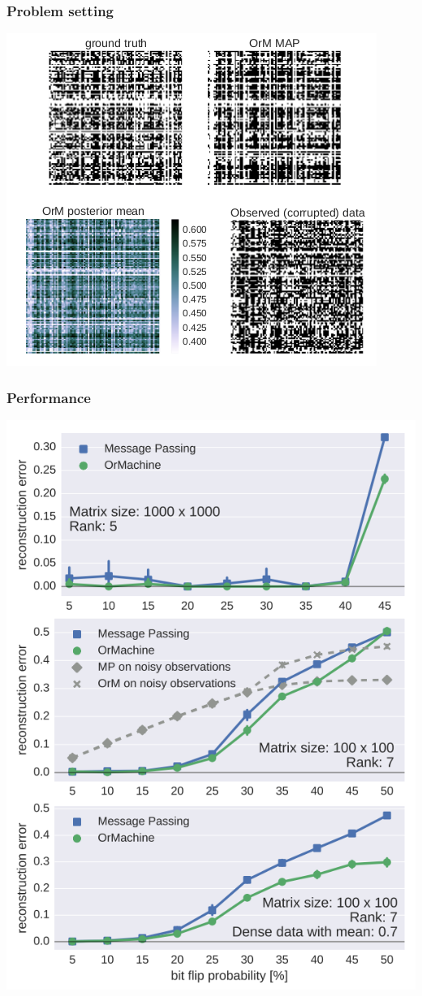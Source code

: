 \documentclass[11pt]{article}
\begin{document}
\subsubsection*{Problem setting}
\label{sec-4-1-1}
\includegraphics[width=.9\linewidth]{./factorisation.png}
\subsubsection*{Performance}
\label{sec-4-1-2}
\includegraphics[width=.9\linewidth]{./factorsiation_performance_new.png}
\end{document}
